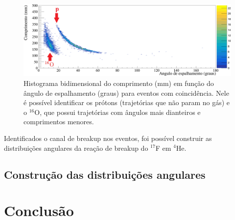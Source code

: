 \documentclass[a4paper,12pt,oneside]{book}
\begin{document}
\begin{figure}[H]
    \centering
    \includegraphics[scale = 1., width=\columnwidth]{figs/comp_vs_ang_n2_coinc_cut12.png}
    \caption{Histograma bidimensional do comprimento (mm) em função do ângulo de espalhamento (graus) para eventos com coincidência. Nele é possível identificar os prótons (trajetórias que não param no gás) e o $^{16}$O, que possui trajetórias com ângulos mais dianteiros e comprimentos menores.}
    \label{fig:comp_vs_ang_coinc}
\end{figure}

\par Identificados o canal de breakup nos eventos, foi possível construir as distribuições angulares da reação de breakup do $^{17}$F em $^4$He.

\section{Construção das distribuições angulares}\label{sec:sec_choque}




\chapter{Conclusão}\label{chapter:conclusao}
\end{document}
